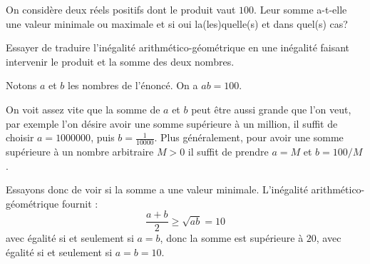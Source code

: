 \begin{exo}
\label{EXO:sp1}
On considère deux réels positifs dont le produit vaut $100$. Leur somme a-t-elle une valeur minimale ou maximale et si oui la(les)quelle(s) et dans quel(s) cas?

\begin{hint}
Essayer de traduire l'inégalité arithmético-géométrique en une inégalité faisant intervenir le produit et la somme des deux nombres.
\end{hint}

\begin{sol} 
Notons $a$ et $b$ les nombres de l'énoncé. On a $ab=100$.

On voit assez vite que la somme de $a$ et $b$ peut être aussi grande que l'on veut, par exemple l'on désire avoir une somme supérieure à un million, il suffit de choisir $a=1000000$, puis  $b=\frac{1}{10000}$. Plus généralement, pour avoir une somme supérieure à un nombre arbitraire $M>0$ il suffit de prendre $a=M$ et $b=100/M$.

Essayons donc de voir si la somme a une valeur minimale.
L'inégalité arithmético-géométrique fournit :
\[ \frac{a+b}{2}\geq \sqrt{ab}=10\]
avec égalité si et seulement si $a=b$, donc la somme est supérieure à $20$, avec égalité si et seulement si $a=b=10$.
\end{sol}  
\end{exo}


